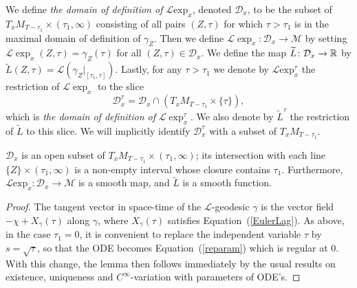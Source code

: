 \begin{definition}\label{def:l-exponential-map}
\label{defnD}

We define {\em the domain of definition of} ${\mathcal L}\mathrm{exp}_x$,  denoted ${\mathcal D}_x$, to be the
subset of $T_xM_{T-\tau_1}\times (\tau_1,\infty)$ consisting of all pairs
$(Z,\tau)$ for which $\tau> \tau_1$ is in the maximal domain of definition of
$\gamma_Z$.  Then we define $\mathcal{L}\exp_{x}\colon {\mathcal D}_x\to
{\mathcal M}$ by setting $\mathcal{L}\exp_{x}(Z,\tau) = \gamma_{Z}(\tau)$
for all $(Z,\tau)\in {\mathcal D}_x$. We
define the map $\widetilde L\colon {\mathcal D}_x\to \mathbb{R}$
by $\widetilde L(Z,\tau)={\mathcal L}\left(\gamma_Z|_{[\tau_1,\tau]}\right)$.
Lastly, for any $\tau> \tau_1$ we denote by ${\mathcal L}\mathrm{exp}_x^\tau$ the restriction of
${\mathcal L}\exp_x$ to the slice
$${\mathcal
D}^\tau_x={\mathcal D}_x\cap \left(T_xM_{T-\tau_1}\times \{\tau\}\right),$$
which is {\em the domain of definition of} ${\mathcal L}\exp_x^\tau$. We
also denote by  $\widetilde L^\tau$ the
restriction of $\widetilde L$ to this slice. We will implicitly identify
${\mathcal D}_x^\tau$ with a subset of $T_xM_{T-\tau_1}$.
\end{definition}



\begin{lemma}\label{lem:l-exponential-smooth}
\label{lcdiffeo}

${\mathcal D}_x$ is an open subset of $T_xM_{T-\tau_1}\times (\tau_1,\infty)$;
its intersection with each line $\{Z\}\times (\tau_1,\infty)$ is a non-empty
interval whose closure contains $\tau_1$. Furthermore, ${\mathcal L}\mathrm{exp}_x\colon {\mathcal D}_x\to {\mathcal M}$ is a smooth map, and $\widetilde
L$ is a smooth function.
\end{lemma}

\begin{proof}
\sketch
{}
The tangent vector in space-time of  the ${\mathcal L}$-geodesic
$\gamma$ is the vector field $-\chi+X_\gamma(\tau)$ along $\gamma$,
where $X_\gamma(\tau)$ satisfies Equation~(\ref{EulerLag}). As
above, in the case $\tau_1=0$, it is convenient to replace the
independent variable $\tau$ by $s=\sqrt{\tau}$, so that the ODE
becomes Equation~(\ref{reparam}) which is regular at $0$. With this
change, the lemma then follows immediately by the usual results on
existence, uniqueness and $C^\infty$-variation with parameters of
ODE's.
\end{proof}


